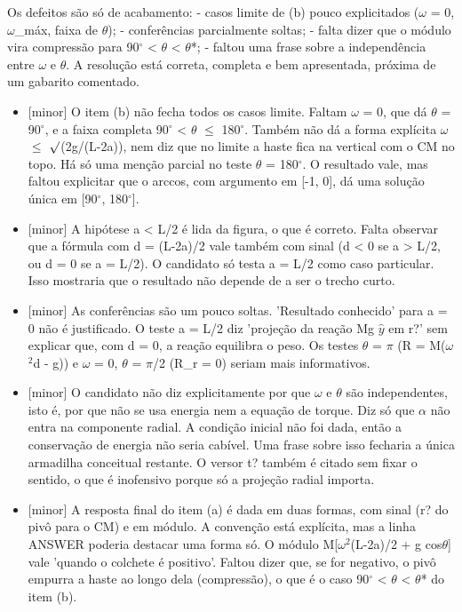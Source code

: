\documentclass{article}%
\begin{document}
\newline%
Os defeitos são só de acabamento:\newline%
{-} casos limite de (b) pouco explicitados ($\omega$ = 0, $\omega$\_máx, faixa de $\theta$);\newline%
{-} conferências parcialmente soltas;\newline%
{-} falta dizer que o módulo vira compressão para 90$^\circ$ < $\theta$ < $\theta$*;\newline%
{-} faltou uma frase sobre a independência entre $\omega$ e $\theta$.\newline%
\newline%
A resolução está correta, completa e bem apresentada, próxima de um gabarito comentado.%
\begin{itemize}%
\item%
{[}minor{]} O item (b) não fecha todos os casos limite. Faltam $\omega$ = 0, que dá $\theta$ = 90$^\circ$, e a faixa completa 90$^\circ$ < $\theta$ $\leq$ 180$^\circ$. Também não dá a forma explícita $\omega$ $\leq$ $\surd$(2g/(L-2a)), nem diz que no limite a haste fica na vertical com o CM no topo. Há só uma menção parcial no teste $\theta$ = 180$^\circ$. O resultado vale, mas faltou explicitar que o arccos, com argumento em {[}-1, 0{]}, dá uma solução única em {[}90$^\circ$, 180$^\circ${]}.%
\item%
{[}minor{]} A hipótese a < L/2 é lida da figura, o que é correto. Falta observar que a fórmula com d = (L-2a)/2 vale também com sinal (d < 0 se a > L/2, ou d = 0 se a = L/2). O candidato só testa a = L/2 como caso particular. Isso mostraria que o resultado não depende de a ser o trecho curto.%
\item%
{[}minor{]} As conferências são um pouco soltas. 'Resultado conhecido' para a = 0 não é justificado. O teste a = L/2 diz 'projeção da reação Mg $\hat y$ em r?' sem explicar que, com d = 0, a reação equilibra o peso. Os testes $\theta$ = $\pi$ (R = M($\omega$$^2$d - g)) e $\omega$ = 0, $\theta$ = $\pi$/2 (R\_r = 0) seriam mais informativos.%
\item%
{[}minor{]} O candidato não diz explicitamente por que $\omega$ e $\theta$ são independentes, isto é, por que não se usa energia nem a equação de torque. Diz só que $\alpha$ não entra na componente radial. A condição inicial não foi dada, então a conservação de energia não seria cabível. Uma frase sobre isso fecharia a única armadilha conceitual restante. O versor t? também é citado sem fixar o sentido, o que é inofensivo porque só a projeção radial importa.%
\item%
{[}minor{]} A resposta final do item (a) é dada em duas formas, com sinal (r? do pivô para o CM) e em módulo. A convenção está explícita, mas a linha ANSWER poderia destacar uma forma só. O módulo M{[}$\omega$$^2$(L-2a)/2 + g cos$\theta${]} vale 'quando o colchete é positivo'. Faltou dizer que, se for negativo, o pivô empurra a haste ao longo dela (compressão), o que é o caso 90$^\circ$ < $\theta$ < $\theta$* do item (b).%
\end{itemize}%
\end{document}
